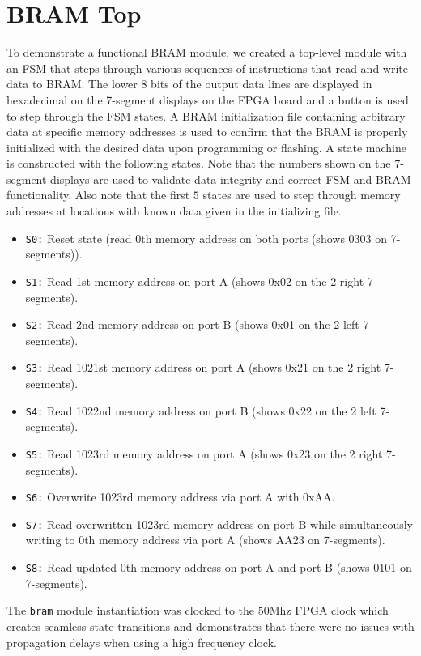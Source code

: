 \documentclass[conference]{IEEEtran}
\begin{document}
\section{BRAM Top}
To demonstrate a functional BRAM module, we created a top-level module with an FSM that steps through various sequences of instructions that read and write data to BRAM. The lower 8 bits of the output data lines are displayed in hexadecimal on the 7-segment displays on the FPGA board and a button is used to step through the FSM states. A BRAM initialization file containing arbitrary data at specific memory addresses is used to confirm that the BRAM is properly initialized with the desired data upon programming or flashing. A state machine is constructed with the following states. Note that the numbers shown on the 7-segment displays are used to validate data integrity and correct FSM and BRAM functionality. Also note that the first $5$ states are used to step through memory addresses at locations with known data given in the initializing file.
\begin{itemize}
    \item \verb|S0:| Reset state (read 0th memory address on both ports (shows 0303 on 7-segments)).
    \item \verb|S1:| Read 1st memory address on port A (shows 0x02 on the 2 right 7-segments).
    \item \verb|S2:| Read 2nd memory address on port B (shows 0x01 on the 2 left 7-segments).
    \item \verb|S3:| Read 1021st memory address on port A (shows 0x21 on the 2 right 7-segments).
    \item \verb|S4:| Read 1022nd memory address on port B (shows 0x22 on the 2 left 7-segments).
    \item \verb|S5:| Read 1023rd memory address on port A (shows 0x23 on the 2 right 7-segments).
    \item \verb|S6:| Overwrite 1023rd memory address via port A with 0xAA.
    \item \verb|S7:| Read overwritten 1023rd memory address on port B while simultaneously writing to 0th memory address via port A (shows AA23 on 7-segments).
    \item \verb|S8:| Read updated 0th memory address on port A and port B (shows 0101 on 7-segments).
\end{itemize}
The \verb|bram| module instantiation was clocked to the $50 \text {Mhz}$ FPGA clock which creates seamless state transitions and demonstrates that there were no issues with propagation delays when using a high frequency clock.
\end{document}

